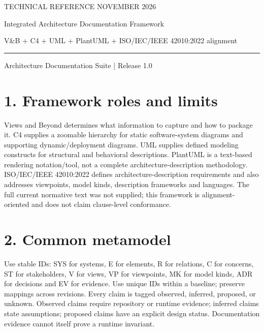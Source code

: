 \documentclass[11pt,letterpaper]{article}
\begin{document}
\thispagestyle{empty}
{\color{accent}\large TECHNICAL REFERENCE \hfill NOVEMBER 2026}\par\vspace{1.1cm}
{\color{ink}\LARGE\bfseries\raggedright Integrated Architecture Documentation Framework}\par\vspace{0.35cm}
{\Large V\&B + C4 + UML + PlantUML + ISO/IEC/IEEE 42010:2022 alignment}\par\vspace{0.55cm}
\rule{\textwidth}{0.7pt}\par\smallskip
{\small Architecture Documentation Suite | Release 1.0}\par\vspace{0.7cm}
\tableofcontents
\newpage
\section*{1. Framework roles and limits}
Views and Beyond determines what information to capture and how to package it. C4 supplies a zoomable hierarchy for static software-system diagrams and supporting dynamic/deployment diagrams. UML supplies defined modeling constructs for structural and behavioral descriptions. PlantUML is a text-based rendering notation/tool, not a complete architecture-description methodology. ISO/IEC/IEEE 42010:2022 defines architecture-description requirements and also addresses viewpoints, model kinds, description frameworks and languages. The full current normative text was not supplied; this framework is alignment-oriented and does not claim clause-level conformance.\par\smallskip
\section*{2. Common metamodel}
Use stable IDs: SYS for systems, E for elements, R for relations, C for concerns, ST for stakeholders, V for views, VP for viewpoints, MK for model kinds, ADR for decisions and EV for evidence. Use unique IDs within a baseline; preserve mappings across revisions. Every claim is tagged observed, inferred, proposed, or unknown. Observed claims require repository or runtime evidence; inferred claims state assumptions; proposed claims have an explicit design status. Documentation evidence cannot itself prove a runtime invariant.\par\smallskip
\end{document}
